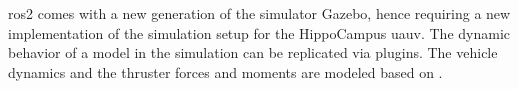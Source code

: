 \ac{ros2} comes with a new generation of the simulator Gazebo, hence requiring a new implementation of the simulation setup for the HippoCampus \ac{uauv}. The dynamic behavior of a model in the simulation can be replicated via plugins. The vehicle dynamics and the thruster forces and moments are modeled based on  .

\label{sec:implementation}
